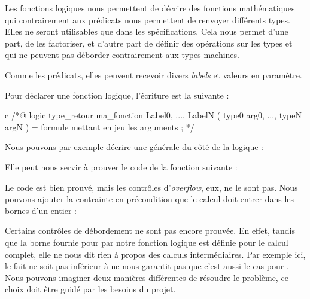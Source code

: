 Les fonctions logiques nous permettent de décrire des fonctions mathématiques
qui contrairement aux prédicats nous permettent de renvoyer différents types.
Elles ne seront utilisables que dans les spécifications. Cela nous permet d'une
part, de les factoriser, et d'autre part de définir des opérations sur les
types  et  qui ne peuvent pas déborder
contrairement aux types machines.



Comme les prédicats, elles peuvent recevoir divers \textit{labels} et valeurs en
paramètre.





Pour déclarer une fonction logique, l'écriture est la suivante :



\begin{CodeBlock}{c}
/*@
  logic type_retour ma_fonction{ Label0, ..., LabelN }( type0 arg0, ..., typeN argN ) =
    formule mettant en jeu les arguments ;
*/
\end{CodeBlock}



Nous pouvons par exemple décrire une  générale du côté de la logique :






Elle peut nous servir à prouver le code de la fonction suivante :








Le code est bien prouvé, mais les contrôles d'\textit{overflow}, eux, ne le sont pas.
Nous pouvons ajouter la contrainte en précondition que le calcul doit entrer dans
les bornes d'un entier :




Certains contrôles de débordement ne sont pas encore prouvée. En effet, tandis que
la borne fournie pour  par notre fonction logique est définie pour
le calcul complet, elle ne nous dit rien à propos des calculs intermédiaires. Par
exemple ici, le fait  ne soit pas inférieur à
 ne nous garantit pas que c'est aussi le cas pour
. Nous pouvons imaginer deux manières différentes de résoudre
le problème, ce choix doit être guidé par les besoins du projet.


